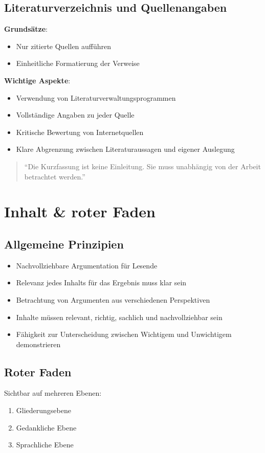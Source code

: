 \documentclass[a4paper,12pt]{article}
\begin{document}
\subsection{Literaturverzeichnis und Quellenangaben}
\textbf{Grundsätze}:
\begin{itemize}
    \item Nur zitierte Quellen aufführen
    \item Einheitliche Formatierung der Verweise
\end{itemize}
\textbf{Wichtige Aspekte}:
\begin{itemize}
    \item Verwendung von Literaturverwaltungsprogrammen
    \item Vollständige Angaben zu jeder Quelle
    \item Kritische Bewertung von Internetquellen
    \item Klare Abgrenzung zwischen Literaturaussagen und eigener Auslegung
\end{itemize}

\begin{quote}
``Die Kurzfassung ist keine Einleitung. Sie muss unabhängig von der Arbeit betrachtet werden.''
\end{quote}

\section{Inhalt \& roter Faden}

\subsection{Allgemeine Prinzipien}
\begin{itemize}
    \item Nachvollziehbare Argumentation für Lesende
    \item Relevanz jedes Inhalts für das Ergebnis muss klar sein
    \item Betrachtung von Argumenten aus verschiedenen Perspektiven
    \item Inhalte müssen relevant, richtig, sachlich und nachvollziehbar sein
    \item Fähigkeit zur Unterscheidung zwischen Wichtigem und Unwichtigem demonstrieren
\end{itemize}

\subsection{Roter Faden}
Sichtbar auf mehreren Ebenen:
\begin{enumerate}
    \item Gliederungsebene
    \item Gedankliche Ebene
    \item Sprachliche Ebene
\end{enumerate}
\end{document}

